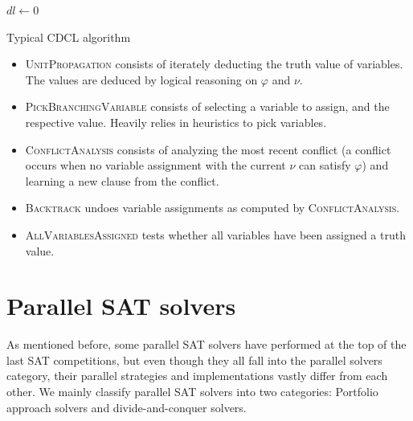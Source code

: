 \documentclass[12pt]{diicc}
\begin{document}
\begin{algorithm}
$dl \leftarrow 0$\\
\caption{Typical CDCL algorithm\label{cdcl}}
\end{algorithm}

\begin{itemize}
	\item \textsc{UnitPropagation} consists of iterately deducting the truth value of variables. The values are deduced by logical reasoning on $\varphi$ and $\nu$.
	\item \textsc{PickBranchingVariable} consists of selecting a variable to assign, and the respective value. Heavily relies in heuristics to pick variables.
	\item \textsc{ConflictAnalysis} consists of analyzing the most recent conflict (a conflict occurs when no variable assignment with the current $\nu$ can satisfy $\varphi$) and learning a new clause from the conflict.
	\item \textsc{Backtrack} undoes variable assignments as computed by \textsc{ConflictAnalysis}.
	\item \textsc{AllVariablesAssigned} tests whether all variables have been assigned a truth value.
\end{itemize}



\section{Parallel SAT solvers}
As mentioned before, some parallel SAT solvers have performed at the top of the last SAT competitions, but even though they all fall into the parallel solvers category, their parallel strategies and implementations vastly differ from each other. We mainly classify parallel SAT solvers into two categories: Portfolio approach solvers and divide-and-conquer solvers.
\end{document}
